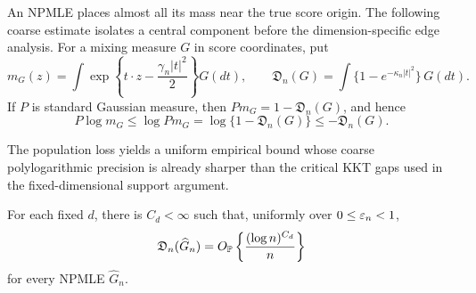 An NPMLE places almost all its mass near the true score origin. The following
coarse estimate isolates a central component before the dimension-specific
edge analysis. For a mixing measure \(G\) in score coordinates, put
\[
    m_G(z)=\int
       \exp\left\{t\cdot z-\frac{\gamma_n|t|^2}{2}\right\}G(dt),
    \qquad
    \mathfrak D_n(G)=\int\{1-e^{-\kappa_n|t|^2}\}\,G(dt).
\]
If \(P\) is standard Gaussian measure, then
\(Pm_G=1-\mathfrak D_n(G)\), and hence
\begin{equation}
\label{eq:support-population-defect}
    P\log m_G\le\log Pm_G
       =\log\{1-\mathfrak D_n(G)\}\le-\mathfrak D_n(G).
\end{equation}

The population loss yields a uniform empirical bound whose coarse
polylogarithmic precision is already sharper than the critical KKT gaps used
in the fixed-dimensional support argument.
\begin{lemma}
\label{lem:support-coarse-defect}
For each fixed \(d\), there is \(C_d<\infty\) such that, uniformly over
\(0\le\varepsilon_n<1\),
\[
    \mathfrak D_n(\widehat G_n)
    =O_{\mathbb P}\left\{\frac{(\log n)^{C_d}}{n}\right\}
\]
for every NPMLE \(\widehat G_n\).
\end{lemma}

